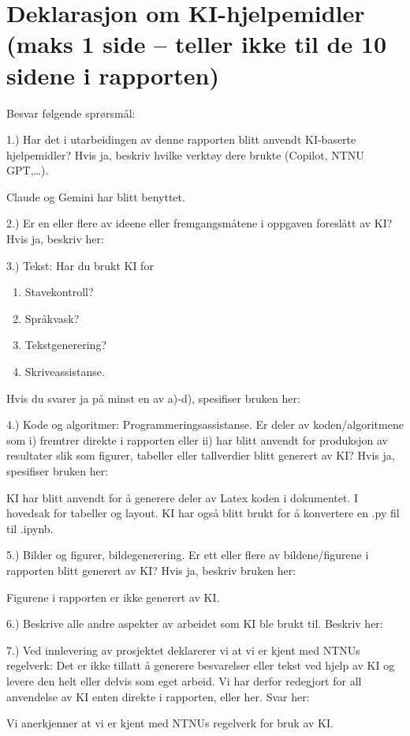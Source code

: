 \section{Deklarasjon om KI-hjelpemidler (maks 1 side -- teller ikke til de 10 sidene i rapporten)}\label{deklarasjon-om-ki-hjelpemidler}

Besvar følgende sprørsmål:

1.) Har det i utarbeidingen av denne rapporten blitt anvendt KI-baserte
hjelpemidler? Hvis ja, beskriv hvilke verktøy dere brukte (Copilot, NTNU
GPT,\ldots).

Claude og Gemini har blitt benyttet.

2.) Er en eller flere av ideene eller fremgangsmåtene i oppgaven
foreslått av KI? Hvis ja, beskriv her:

3.) Tekst: Har du brukt KI for

\begin{enumerate}
\def\labelenumi{\alph{enumi})}
\tightlist
\item
  Stavekontroll?
\item
  Språkvask?
\item
  Tekstgenerering?
\item
  Skriveassistanse.
\end{enumerate}

Hvis du svarer ja på minst en av a)-d), spesifiser bruken her:

4.) Kode og algoritmer: Programmeringsassistanse. Er deler av
koden/algoritmene som i) fremtrer direkte i rapporten eller ii) har
blitt anvendt for produksjon av resultater slik som figurer, tabeller
eller tallverdier blitt generert av KI? Hvis ja, spesifiser bruken her:

KI har blitt anvendt for å generere deler av Latex koden i dokumentet. I hovedsak for tabeller og layout. KI har også blitt brukt for å konvertere en .py fil til .ipynb.

5.) Bilder og figurer, bildegenerering. Er ett eller flere av
bildene/figurene i rapporten blitt generert av KI? Hvis ja, beskriv
bruken her:

Figurene i rapporten er ikke generert av KI.

6.) Beskrive alle andre aspekter av arbeidet som KI ble brukt til.
Beskriv her:

7.) Ved innlevering av prosjektet deklarerer vi at vi er kjent med NTNUs
regelverk: Det er ikke tillatt å generere besvarelser eller tekst ved
hjelp av KI og levere den helt eller delvis som eget arbeid. Vi har
derfor redegjort for all anvendelse av KI enten direkte i rapporten,
eller her. Svar her:

Vi anerkjenner at vi er kjent med NTNUs regelverk for bruk av KI.